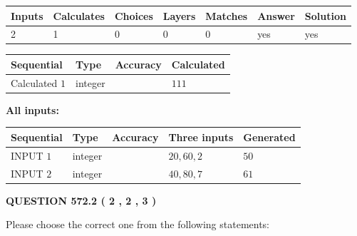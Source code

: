 \documentclass[12pt]{article}
\begin{document}
 
\noindent{}
 
 

 
   
   
   
   
\noindent\begin{tabular}{|l|l|l|l|l|l|l|}
 \hline
Inputs & Calculates & Choices & Layers & Matches & Answer & Solution \\ \hline
 2  & 
 1  & 
 0
  & 
 0  & 
 0  & 
  yes & 
  yes 
  \\ \hline
 \end{tabular}
   
   
   
   
\noindent{}
   
   
  
  
\noindent\begin{tabular}{|l|l|l|l|}
\hline
 Sequential & Type & Accuracy & Calculated \\ 
\hline
 
 
  Calculated $  1 $ & integer &  & 
  $ 111 $ 
 \\  \hline  
 \end{tabular}
   
   
   
   
\noindent\vspace{0.1in}\hspace{-0.08in} {\textbf{\Large{All inputs: }}}
   
   
  
  
\noindent\begin{tabular}{|l|l|l|l|l|}
\hline
 Sequential & Type & Accuracy & Three inputs & Generated \\ 
\hline
 
 
  INPUT $  1 $ & integer &  & $
 20
 , 
 60
 , 
 2
 $ & $ 50 $ 
 \\  \hline  
 
 
  INPUT $  2 $ & integer &  & $
 40
 , 
 80
 , 
 7
 $ & $ 61 $ 
 \\  \hline  
 \end{tabular}
   
   
  
\vspace{0.2in}
  
{\textbf{\Large{QUESTION
572.2 
 ( 2 , 2 , 3 )
}}}
  
  
Please choose the correct one from the following statements:
 
\end{document}
